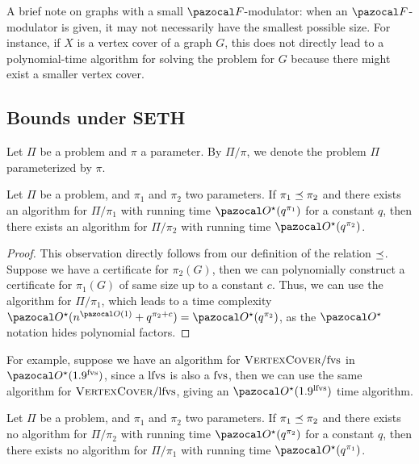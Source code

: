 \medskip

A brief note on graphs with a small $\F$-modulator: when an $\F$-modulator is given, it may not necessarily have the smallest possible size. For instance, if $X$ is a vertex cover of a graph $G$, this does not directly lead to a polynomial-time algorithm for solving the  problem for $G$ because there might exist a smaller vertex cover.

\subsection{Bounds under SETH}

Let $\Pi$ be a problem and $\pi$ a parameter. By $\Pi/\pi$, we denote the problem $\Pi$ parameterized by $\pi$.

\begin{observation}
    \label{obs:upper_bound}
    Let $\Pi$ be a problem, and $\pi_1$ and $\pi_2$ two parameters. If $\pi_1 \preceq \pi_2$ and there exists an algorithm for $\Pi/\pi_1$ with running time $\O^\star(q^{\pi_1})$ for a constant $q$, then there exists an algorithm for $\Pi/\pi_2$ with running time $\O^\star(q^{\pi_2})$.
\end{observation}

\begin{proof}
    This observation directly follows from our definition of the relation $\preceq$. Suppose we have a certificate for $\pi_2(G)$, then we can polynomially construct a certificate for $\pi_1(G)$ of same size up to a constant $c$. Thus, we can use the algorithm for $\Pi/\pi_1$, which leads to a time complexity $\O^\star(n^{\O(1)} + q^{\pi_2 + c}) = \O^\star(q^{\pi_2})$, as the $\O^\star$ notation hides polynomial factors. 
\end{proof}

For example, suppose we have an algorithm for $\textsc{VertexCover}/\text{fvs}$ in $\O^\star(1.9^\fvs)$, since a $\text{lfvs}$ is also a $\text{fvs}$, then we can use the same algorithm for $\textsc{VertexCover}/\text{lfvs}$, giving an $\O^\star(1.9^\lfvs)$ time algorithm.

\begin{observation}
    \label{obs:lower_bound}
    Let $\Pi$ be a problem, and $\pi_1$ and $\pi_2$ two parameters. If $\pi_1 \preceq \pi_2$ and there exists no algorithm for $\Pi/\pi_2$ with running time $\O^\star(q^{\pi_2})$ for a constant $q$, then there exists no algorithm for $\Pi/\pi_1$ with running time $\O^\star(q^{\pi_1})$.
\end{observation}

